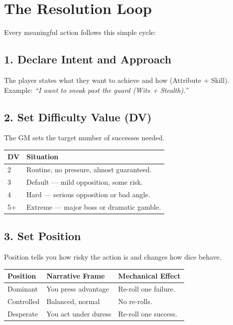 \documentclass[11pt]{book}
\begin{document}
\section{The Resolution Loop}

Every meaningful action follows this simple cycle:

\subsection*{1. Declare Intent and Approach}
The player states what they want to achieve and how (Attribute + Skill). Example: \textit{``I want to sneak past the guard (Wits + Stealth).''}

\subsection*{2. Set Difficulty Value (DV)}
The GM sets the target number of successes needed.

\begin{center}
\begin{tabular}{ll}
\toprule
\textbf{DV} & \textbf{Situation} \\
\midrule
2 & Routine, no pressure, almost guaranteed. \\
3 & Default --- mild opposition, some risk. \\
4 & Hard --- serious opposition or bad angle. \\
5+ & Extreme --- major boss or dramatic gamble. \\
\bottomrule
\end{tabular}
\end{center}

\subsection*{3. Set Position}
Position tells you how risky the action is and changes how dice behave.

\begin{center}
\begin{tabular}{lll}
\toprule
\textbf{Position} & \textbf{Narrative Frame} & \textbf{Mechanical Effect} \\
\midrule
Dominant & You press advantage & Re-roll one failure. \\
Controlled & Balanced, normal & No re-rolls. \\
Desperate & You act under duress & Re-roll one success. \\
\bottomrule
\end{tabular}
\end{center}
\end{document}
